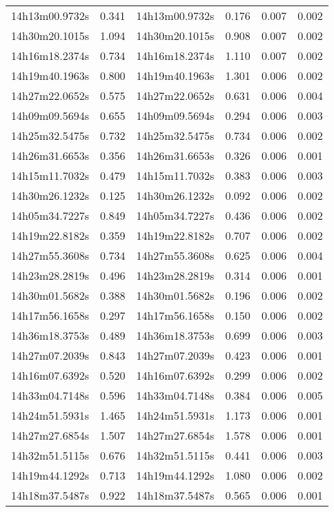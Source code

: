 \begin{table}
\begin{tabular}{cccccc}
14h13m00.9732s & 0.341 & 14h13m00.9732s & 0.176 & 0.007 & 0.002 \\
14h30m20.1015s & 1.094 & 14h30m20.1015s & 0.908 & 0.007 & 0.002 \\
14h16m18.2374s & 0.734 & 14h16m18.2374s & 1.110 & 0.007 & 0.002 \\
14h19m40.1963s & 0.800 & 14h19m40.1963s & 1.301 & 0.006 & 0.002 \\
14h27m22.0652s & 0.575 & 14h27m22.0652s & 0.631 & 0.006 & 0.004 \\
14h09m09.5694s & 0.655 & 14h09m09.5694s & 0.294 & 0.006 & 0.003 \\
14h25m32.5475s & 0.732 & 14h25m32.5475s & 0.734 & 0.006 & 0.002 \\
14h26m31.6653s & 0.356 & 14h26m31.6653s & 0.326 & 0.006 & 0.001 \\
14h15m11.7032s & 0.479 & 14h15m11.7032s & 0.383 & 0.006 & 0.003 \\
14h30m26.1232s & 0.125 & 14h30m26.1232s & 0.092 & 0.006 & 0.002 \\
14h05m34.7227s & 0.849 & 14h05m34.7227s & 0.436 & 0.006 & 0.002 \\
14h19m22.8182s & 0.359 & 14h19m22.8182s & 0.707 & 0.006 & 0.002 \\
14h27m55.3608s & 0.734 & 14h27m55.3608s & 0.625 & 0.006 & 0.004 \\
14h23m28.2819s & 0.496 & 14h23m28.2819s & 0.314 & 0.006 & 0.001 \\
14h30m01.5682s & 0.388 & 14h30m01.5682s & 0.196 & 0.006 & 0.002 \\
14h17m56.1658s & 0.297 & 14h17m56.1658s & 0.150 & 0.006 & 0.002 \\
14h36m18.3753s & 0.489 & 14h36m18.3753s & 0.699 & 0.006 & 0.003 \\
14h27m07.2039s & 0.843 & 14h27m07.2039s & 0.423 & 0.006 & 0.001 \\
14h16m07.6392s & 0.520 & 14h16m07.6392s & 0.299 & 0.006 & 0.002 \\
14h33m04.7148s & 0.596 & 14h33m04.7148s & 0.384 & 0.006 & 0.005 \\
14h24m51.5931s & 1.465 & 14h24m51.5931s & 1.173 & 0.006 & 0.001 \\
14h27m27.6854s & 1.507 & 14h27m27.6854s & 1.578 & 0.006 & 0.001 \\
14h32m51.5115s & 0.676 & 14h32m51.5115s & 0.441 & 0.006 & 0.003 \\
14h19m44.1292s & 0.713 & 14h19m44.1292s & 1.080 & 0.006 & 0.002 \\
14h18m37.5487s & 0.922 & 14h18m37.5487s & 0.565 & 0.006 & 0.001 \\

\end{tabular}
\end{table}

